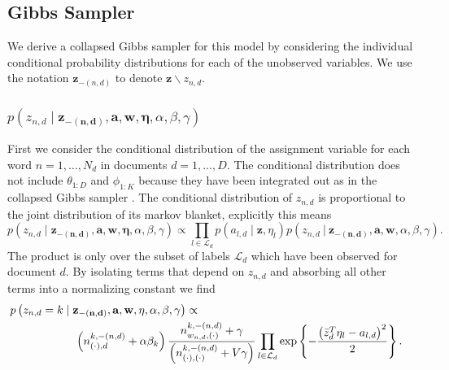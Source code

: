 \documentclass{article}
\begin{document}
\subsection{Gibbs Sampler}

We derive a collapsed Gibbs sampler for this model by considering the individual conditional probability distributions for
each of the unobserved variables.  We use the notation $\mathbf{z}_{-(n,d)}$ to denote $\mathbf{z} \backslash z_{n,d}$.
\subsubsection{$p\left(z_{n,d} \mid\mathbf{z_{-\left(n,d\right)}},\mathbf{a},\mathbf{w},\mathbf{\eta},\alpha,\beta,\gamma\right)$}
%
First we consider the conditional distribution of the assignment variable for each word $n = 1, \ldots, N_d$ in documents $d = 1, \ldots, D$.  The conditional distribution does not include $\theta_{1:D}$ and $\phi_{1:K}$ because they have been integrated out as in the collapsed Gibbs sampler \citep{Griffiths04}.  The conditional distribution of $z_{n,d}$ is proportional to the joint distribution of its markov blanket, explicitly this means
%
%
%
\begin{equation}
p\left(z_{n,d}\mid\mathbf{z_{-\left(n,d\right)}},\mathbf{a},\mathbf{w},\mathbf{\eta},\alpha,\beta,\gamma\right)\propto \prod_{l \in \mathcal{L}_d}p\left(a_{l,d}\mid\mathbf{z},\eta_l \right)p\left(z_{n,d} \ | \ \mathbf{z_{-\left(n, d \right)}},\mathbf{a},\mathbf{w},\alpha,\beta,\gamma\right).
\end{equation}
%
The product is only over the subset of labels $\mathcal{L}_d$ which have been observed for document $d$. By isolating terms that depend on $z_{n,d}$ and absorbing all other terms into a normalizing constant \citep{Griffiths04} we find 
%
\begin{eqnarray}
\lefteqn{p\left(z_{n,d} = k \mid\mathbf{z_{-\left(n,d\right)}},\mathbf{a},\mathbf{w}, \mathbf{\eta},\alpha,\beta,\gamma\right)\propto} \nonumber\\ 
& \hspace{2cm}  \left(n_{\left(\cdot\right),d}^{k,-\left(n,d\right)}+\alpha\beta_{k}\right)\frac{n_{w_{n,d},\left(\cdot\right)}^{k,-\left(n,d\right)}+\gamma}{\left(n_{\left(\cdot\right),\left(\cdot\right)}^{k,-\left(n,d\right)}+V\gamma\right)} \prod_{l \in \mathcal{L}_d} \exp\left\{ -\frac{\left(\bar z_d^{T}\eta_{l}-a_{l,d} \right)^{2}}{2}\right\}\label{eq:z-likelihood}.
\end{eqnarray}
\end{document}
